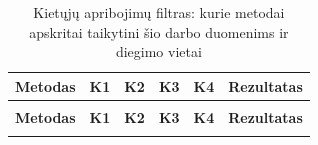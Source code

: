 \begingroup
\footnotesize
\setlength{\tabcolsep}{3pt}
\sloppy
\begin{xltabular}{\textwidth}{@{}
  >{\raggedright\arraybackslash}p{3.5cm}
  >{\centering\arraybackslash}p{0.8cm}
  >{\centering\arraybackslash}p{0.8cm}
  >{\centering\arraybackslash}p{0.8cm}
  >{\centering\arraybackslash}p{0.8cm}
  >{\raggedright\arraybackslash}X@{}}
\caption{Kietųjų apribojimų filtras: kurie metodai apskritai taikytini
         šio darbo duomenims ir diegimo vietai}
\label{tab:filtras} \\
\toprule
\textbf{Metodas} & \textbf{K1} & \textbf{K2} & \textbf{K3} & \textbf{K4}
  & \textbf{Rezultatas} \\
\midrule
\endfirsthead
{} \\
\toprule
\textbf{Metodas} & \textbf{K1} & \textbf{K2} & \textbf{K3} & \textbf{K4}
  & \textbf{Rezultatas} \\
\midrule
\endhead
\bottomrule
\endlastfoot


\end{xltabular}
